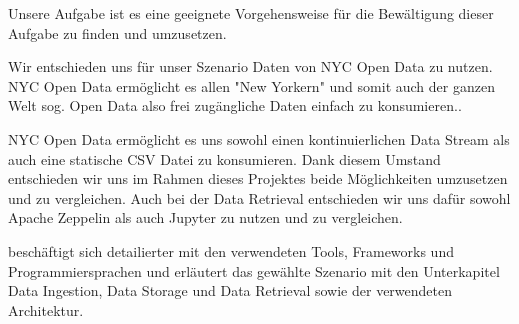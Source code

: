 Unsere Aufgabe ist es eine geeignete Vorgehensweise für die Bewältigung dieser Aufgabe zu finden und umzusetzen.

Wir entschieden uns für unser Szenario Daten von NYC Open Data zu nutzen.
NYC Open Data ermöglicht es allen "New Yorkern" und somit auch der ganzen Welt sog. Open Data also frei zugängliche Daten
einfach zu konsumieren.\autocite{NYCOpenData}.

NYC Open Data ermöglicht es uns sowohl einen kontinuierlichen Data Stream als auch eine statische \ac{CSV} Datei zu konsumieren.
Dank diesem Umstand entschieden wir uns im Rahmen dieses Projektes beide Möglichkeiten umzusetzen und zu vergleichen.
Auch bei der Data Retrieval entschieden wir uns dafür sowohl Apache Zeppelin als auch Jupyter zu nutzen und zu vergleichen.

 beschäftigt sich detailierter mit den verwendeten Tools, Frameworks und Programmiersprachen und 
erläutert das gewählte Szenario mit den Unterkapitel Data Ingestion, Data Storage und Data Retrieval sowie der verwendeten Architektur.
